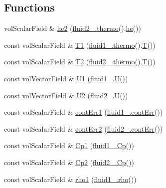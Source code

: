 \subsection*{Functions}
\begin{DoxyCompactItemize}
\item 
vol\+Scalar\+Field \& \hyperlink{EEqns__2p_8H_af939283a47b2563040fc040c5bd500d5}{he2} (\hyperlink{EEqns__2p_8H_a9d615e711281a88a96c648787c7dbd32}{fluid2\+\_\+.\+thermo}().\hyperlink{EEqn__1pl_8H_aaacc8fea926e2b83e418a1ad3c1e8c43}{he}())
\item 
const vol\+Scalar\+Field \& \hyperlink{EEqns__2p_8H_a016032aa1b1ec0dd197a68119b12fd52}{T1} (\hyperlink{EEqns__2p_8H_a9d615e711281a88a96c648787c7dbd32}{fluid1\+\_\+.\+thermo}().\hyperlink{EEqn__1pl_8H_ad0f94aa7ea43d4be0bae24e3a89aad0c}{T}())
\item 
const vol\+Scalar\+Field \& \hyperlink{EEqns__2p_8H_a616e91adeb29d49ab9d9f35f0124ab4a}{T2} (\hyperlink{EEqns__2p_8H_a9d615e711281a88a96c648787c7dbd32}{fluid2\+\_\+.\+thermo}().\hyperlink{EEqn__1pl_8H_ad0f94aa7ea43d4be0bae24e3a89aad0c}{T}())
\item 
const vol\+Vector\+Field \& \hyperlink{EEqns__2p_8H_aaab6b554a159f5b9398870162ee1b75a}{U1} (\hyperlink{UEqn__1pl_8H_abe23fa3afe09cc511569a7dca4160561}{fluid1\+\_\+.\+U}())
\item 
const vol\+Vector\+Field \& \hyperlink{EEqns__2p_8H_ab20f8ec2c8a82ce36b274ea55f93ae0c}{U2} (\hyperlink{UEqn__1pl_8H_abe23fa3afe09cc511569a7dca4160561}{fluid2\+\_\+.\+U}())
\item 
const vol\+Scalar\+Field \& \hyperlink{EEqns__2p_8H_a4c0cef2cbbdf508f8153077c9bfaa08c}{cont\+Err1} (\hyperlink{EEqn__1pl_8H_ac772c4e2535e2242a1e052c268cb9c19}{fluid1\+\_\+.\+cont\+Err}())
\item 
const vol\+Scalar\+Field \& \hyperlink{EEqns__2p_8H_a3d067d745901db813a631c4d49681605}{cont\+Err2} (\hyperlink{EEqn__1pl_8H_ac772c4e2535e2242a1e052c268cb9c19}{fluid2\+\_\+.\+cont\+Err}())
\item 
const vol\+Scalar\+Field \& \hyperlink{EEqns__2p_8H_a668ac7d3e5250ceec860fdab2fe59c38}{Cp1} (\hyperlink{EEqns__2p_8H_a22e809ffe40f4576f41f9d568f210983}{fluid1\+\_\+.\+Cp}())
\item 
const vol\+Scalar\+Field \& \hyperlink{EEqns__2p_8H_a4729d684f71ad1966c07480036871539}{Cp2} (\hyperlink{EEqns__2p_8H_a22e809ffe40f4576f41f9d568f210983}{fluid2\+\_\+.\+Cp}())
\item 
const vol\+Scalar\+Field \& \hyperlink{EEqns__2p_8H_a507feeb77713b530418150ab2aec1b9e}{rho1} (\hyperlink{EEqn__1pl_8H_ac955f87ac2b79f02f420cae087fc52b1}{fluid1\+\_\+.\+rho}())

\end{DoxyCompactItemize}
